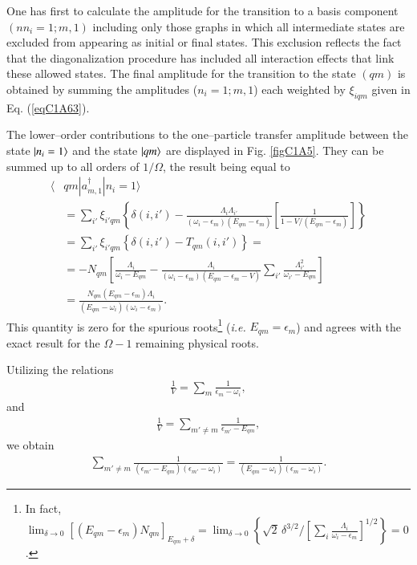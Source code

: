 One has first to calculate the amplitude for the transition to a basis component $(n
n_i= 1; m, 1)$ including only those graphs in which all intermediate states are excluded from appearing as initial or final states. This exclusion reflects the fact that the diagonalization procedure has included all interaction effects that link these allowed states. The final amplitude for the transition to the state $(qm)$ is obtained by summing the amplitudes  ($n_i=1;m,1$) each weighted by  $\xi_{iqm}$ given in Eq. (\ref{eqC1A63}). 

The lower--order contributions to the one--particle transfer amplitude between the state $|{n_i=1} \rangle$ and the state $|{qm} \rangle$ are displayed in Fig. \ref{figC1A5}. They can be summed up to all orders of $1/\Omega$, the result being equal to 
  \begin{align}\label{eqC1A73} 
   \nonumber \langle & qm|a^\dagger_{m,1}|n_i=1\rangle\\
\nonumber &=\sum_{i'}\xi_{i'qm}\left\{\delta(i,i')-\frac{\Lambda_i\Lambda_{i'}}{(\omega_i-\epsilon_m)(E_{qm}-\epsilon_m)}\left[\frac{1}{1-V/(E_{qm}-\epsilon_m)}\right]\right\}\\
\nonumber &=\sum_{i'}\xi_{i'qm}\left\{\delta(i,i')-T_{qm}(i,i')\right\}=\\
\nonumber & =-N_{qm}\left[\frac{\Lambda_i}{\omega_i-E_{qm}}-\frac{\Lambda_i}{(\omega_i-\epsilon_m)(E_{qm}-\epsilon_m-V)}\sum_{i'}\frac{\Lambda_{i'}^2}{\omega_{i'}-E_{qm}}\right]\\
&=\frac{N_{qm}(E_{qm}-\epsilon_m)\Lambda_i}{(E_{qm}-\omega_i)(\omega_i-\epsilon_m)}.
\end{align} 
This quantity is zero for the spurious roots\footnote{In fact, $\lim_{\delta\to0}[(E_{qm}-\epsilon_m)N_{qm}]_{E_{qm}+\delta}=\lim_{\delta\to0}\left\{\sqrt{2}\,\delta^{3/2}/[\sum_i\frac{\Lambda_i}{\omega_i-\epsilon_m}]^{1/2}\right\}=0$.} (\textit{i.e.} $E_{qm}=\epsilon_m$) and agrees with the exact result for the $\Omega-1$ remaining physical roots. 


Utilizing the relations
  \begin{align}\label{eqC1A74} 
  \frac{1}{V}=\sum_m\frac{1}{\epsilon_m-\omega_i},
    \end{align}  
and  
  \begin{align}\label{eqC1A75} 
   \frac{1}{V}=\sum_{m'\neq m}\frac{1}{\epsilon_{m'}-E_{qm}},
    \end{align} 
we  obtain  
  \begin{align}\label{eqC1A76} 
   \sum_{m'\neq m}\frac{1}{(\epsilon_{m'}-E_{qm})(\epsilon_{m'}-\omega_i)}=\frac{1}{(E_{qm}-\omega_i)(\epsilon_m-\omega_i)}.
    \end{align} 

